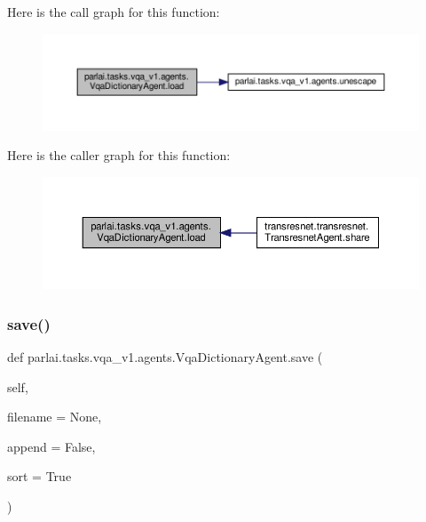 Here is the call graph for this function\+:
\nopagebreak
\begin{figure}[H]
\begin{center}
\leavevmode
\includegraphics[width=350pt]{classparlai_1_1tasks_1_1vqa__v1_1_1agents_1_1VqaDictionaryAgent_ac84980d21c96740bb94d4215256937ac_cgraph}
\end{center}
\end{figure}
Here is the caller graph for this function\+:
\nopagebreak
\begin{figure}[H]
\begin{center}
\leavevmode
\includegraphics[width=350pt]{classparlai_1_1tasks_1_1vqa__v1_1_1agents_1_1VqaDictionaryAgent_ac84980d21c96740bb94d4215256937ac_icgraph}
\end{center}
\end{figure}
\mbox{\label{classparlai_1_1tasks_1_1vqa__v1_1_1agents_1_1VqaDictionaryAgent_ac547c4960c1f49242d42c07264d6e047}} 
\subsubsection{\texorpdfstring{save()}{save()}}
{\footnotesize\ttfamily def parlai.\+tasks.\+vqa\+\_\+v1.\+agents.\+Vqa\+Dictionary\+Agent.\+save (\begin{DoxyParamCaption}\item[{}]{self,  }\item[{}]{filename = {\ttfamily None},  }\item[{}]{append = {\ttfamily False},  }\item[{}]{sort = {\ttfamily True} }\end{DoxyParamCaption})}

